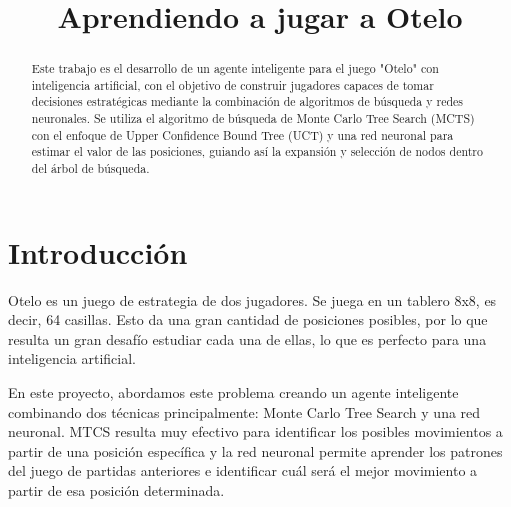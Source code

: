\documentclass[conference]{IEEEtran}
\begin{document}
\title{Aprendiendo a jugar a Otelo\\
}

\author{
\and
{}
}

\maketitle

\begin{abstract}
    Este trabajo es el desarrollo de un agente inteligente para el juego "Otelo" con inteligencia artificial, con el objetivo de construir jugadores capaces de tomar decisiones estratégicas mediante la combinación de algoritmos de búsqueda y redes neuronales.
Se utiliza el algoritmo de búsqueda de Monte Carlo Tree Search (MCTS) con el enfoque de Upper Confidence Bound Tree (UCT) y una red neuronal para estimar el valor de las posiciones, guiando así la expansión y selección de nodos dentro del árbol de búsqueda.
\end{abstract}

\section{Introducción}
Otelo es un juego de estrategia de dos jugadores. Se juega en un tablero 8x8, es decir, 64 casillas. Esto da una gran cantidad de posiciones posibles, por lo que resulta un gran desafío estudiar cada una de ellas, lo que es perfecto para una inteligencia artificial.

En este proyecto, abordamos este problema creando un agente inteligente combinando dos técnicas principalmente: Monte Carlo Tree Search y una red neuronal. MTCS resulta muy efectivo para identificar los posibles movimientos a partir de una posición específica y la red neuronal permite aprender los patrones del juego de partidas anteriores e identificar cuál será el mejor movimiento a partir de esa posición determinada.
\end{document}
